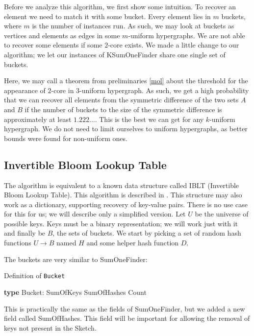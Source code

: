 Before we analyze this algorithm, we first show some intuition. To recover an element we need to match it with some bucket. Every element lies in $m$ buckets, where $m$ is the number of instances run. As such, we may look at buckets as vertices and elements as edges in some $m$-uniform hypergraphs. We are not able to recover some elements if some $2$-core exists. We made a little change to our algorithm; we let our instances of KSumOneFinder share one single set of buckets.

Here, we may call a theorem from preliminaries \ref{mol} about the threshold for the appearance of $2$-core in $3$-uniform hypergraph. As such, we get a high probability that we can recover all elements from the symmetric difference of the two sets $A$ and $B$ if the number of buckets to the size of the symmetric difference is approximately at least $1.222\dots$. This is the best we can get for any $k$-uniform hypergraph. We do not need to limit ourselves to uniform hypergraphs, as better bounds were found for non-uniform ones. 

\subsection{Invertible Bloom Lookup Table} \label{iblt}
The algorithm is equivalent to a known data structure called IBLT (Invertible Bloom Lookup Table). This algorithm is described in \cite{6120248}. This structure may also work as a dictionary, supporting recovery of key-value pairs. There is no use case for this for us; we will describe only a simplified version. Let $U$ be the universe of possible keys. Keys must be a binary representation; we will work just with it and finally be $B$, the sets of buckets. We start by picking a set of random hash functions $U \rightarrow B$ named $H$ and some helper hash function $D$.

The buckets are very similar to SumOneFinder:
\begin{algorithm}
\caption{Definition of \texttt{Bucket}}
\begin{algorithmic}[1]
\State \textbf{type} Bucket:
    \State \hspace{\algorithmicindent} SumOfKeys
    \State \hspace{\algorithmicindent} SumOfHashes
    \State \hspace{\algorithmicindent} Count
\end{algorithmic}
\end{algorithm}
This is practically the same as the fields of SumOneFinder, but we added a new field called SumOfHashes. This field will be important for allowing the removal of keys not present in the Sketch.

